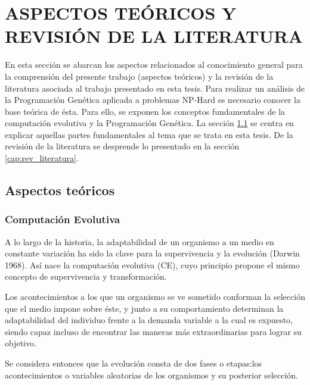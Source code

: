 
\chapter{ASPECTOS TEÓRICOS Y REVISIÓN DE LA LITERATURA}
\label{cap:estado_del_arte}


En esta sección se abarcan los aspectos relacionados al conocimiento general para la comprensión del presente trabajo (aspectos teóricos) y la revisión de la literatura asociada al trabajo presentado en esta tesis.
Para realizar un análisis de la Programación Genética aplicada a problemas NP-Hard es necesario conocer la base teórica de ésta. Para ello, se exponen los conceptos fundamentales de la computación evolutiva y la Programación Genética. La sección \ref{cap:aspectos_teoricos} se centra en explicar aquellas partes fundamentales al tema que se trata en esta tesis. De la revisión de la literatura se desprende lo presentado en la sección \ref{cap:rev_literatura}.

\section{Aspectos teóricos}
\label{cap:aspectos_teoricos}


\subsection{Computación Evolutiva}
\label{cap:ce}

A lo largo de la historia, la adaptabilidad de un organismo a un medio en constante variación ha sido la clave para la supervivencia y la evolución (Darwin 1968). Así nace la computación evolutiva (CE), cuyo principio  propone el mismo concepto de supervivencia y transformación.

Los acontecimientos a los que un organismo se ve sometido conforman la selección que el medio impone sobre éste, y junto a su comportamiento determinan la adaptabilidad del individuo frente a la demanda variable a la cual es expuesto, siendo capaz incluso de encontrar las maneras más extraordinarias para lograr su objetivo.

Se considera entonces que la evolución consta de dos fases o etapas:los acontecimientos o variables aleatorias de los organismos y su posterior selección.

